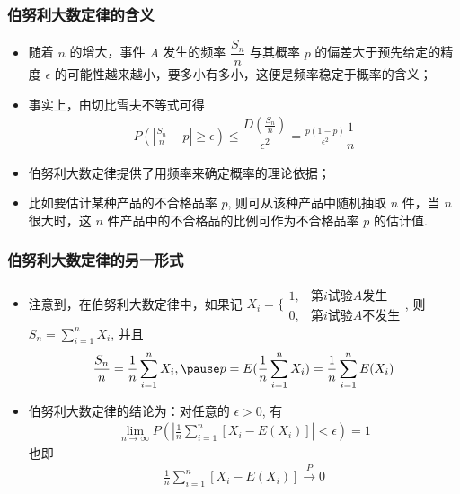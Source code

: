 \begin{frame}
	\frametitle{伯努利大数定律的含义}
	\begin{itemize}[<+-|alert@+>]
		\item 随着 $n$ 的增大，事件 $A$ 发生的频率 $\dfrac{S_n}{n}$ 与其概率 $p$ 的偏差大于预先给定的精度 $\epsilon$ 的可能性越来越小，要多小有多小，这便是频率稳定于概率的含义；
		\item 事实上，由切比雪夫不等式可得
		\begin{eqnarray*}
			P(|\frac{S_n}{n}-p|\ge\epsilon)\le \dfrac{D(\frac{S_n}{n})}{\epsilon^2}=\frac{p(1-p)}{\epsilon^2}\dfrac{1}{n}
		\end{eqnarray*}

		\item 伯努利大数定律提供了用频率来确定概率的理论依据；
		\item 比如要估计某种产品的不合格品率 $p$, 则可从该种产品中随机抽取 $n$ 件，当 $n$ 很大时，这 $n$ 件产品中的不合格品的比例可作为不合格品率 $p$ 的估计值.
	\end{itemize}
\end{frame}
\begin{frame}
	\frametitle{伯努利大数定律的另一形式}
	\begin{itemize}[<+-|alert@+>]
		\item 注意到，在伯努利大数定律中，如果记 $X_i=\bigg\{
		\begin{array}{ll}
			1,& \mbox{第} i\mbox{试验} A\mbox{发生}\\
			0,& \mbox{第} i\mbox{试验} A\mbox{不发生}
		\end{array}
		$, 则 $S_n=\sum_{i=1}^nX_i$, 并且
		\begin{eqnarray*}
			\frac{S_n}{n}=\frac{1}{n}\sum_{i=1}^nX_i, \pause p=E(\frac{1}{n}\sum_{i=1}^nX_i)=\frac{1}{n}\sum_{i=1}^nE(X_i)
		\end{eqnarray*}
		\item 伯努利大数定律的结论为：对任意的 $\epsilon>0$, 有
		\begin{eqnarray*}
			\lim_{n\rightarrow\infty}P(|\frac{1}{n}\sum_{i=1}^n[X_i-E(X_i)]|<\epsilon)=1
		\end{eqnarray*}
		也即
		\begin{eqnarray*}
			\frac{1}{n}\sum_{i=1}^n[X_i-E(X_i)]\stackrel{P}{\rightarrow}0
		\end{eqnarray*}

	\end{itemize}

\end{frame}
